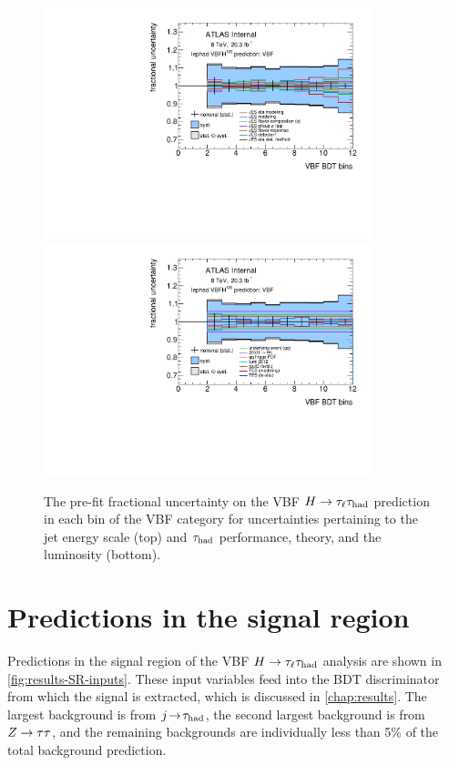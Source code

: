 \begin{figure}[tp]
  \includegraphics[width=0.85\textwidth]{figures/uncertainties/uncertainties_lephad_paper14_8TeV_VBFH125_JES_VBF}
  \includegraphics[width=0.85\textwidth]{figures/uncertainties/uncertainties_lephad_paper14_8TeV_VBFH125_other_VBF}
  \caption{The pre-fit fractional uncertainty on the VBF $H\rightarrow\tau_\ell\tau_\text{had}$ prediction in each bin of the VBF category for uncertainties pertaining to the jet energy scale (top) and $\tau_\text{had}$ performance, theory, and the luminosity (bottom).}
  \label{fig:backgrounds-uncertainties-vbf}
\end{figure}

\section{Predictions in the signal region}
\label{sec:results-prefit}

Predictions in the signal region of the VBF $H\rightarrow\tau_\ell\tau_\text{had}$ analysis are shown in \cref{fig:results-SR-inputs}. These input variables feed into the BDT discriminator from which the signal is extracted, which is discussed in \cref{chap:results}. The largest background is from $j\!\rightarrow\!\tau_\text{had}$, the second largest background is from $Z\rightarrow\tau\tau$, and the remaining backgrounds are individually less than 5\% of the total background prediction.

